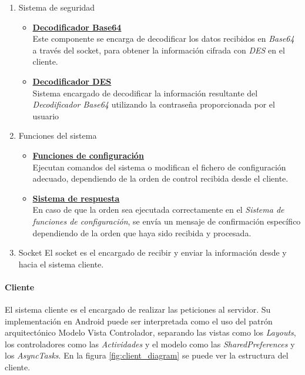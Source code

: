 \documentclass[12pt]{article}
\begin{document}
            \begin{enumerate}
                \item Sistema de seguridad
                    \begin{itemize}
                        \item \textbf{\underline{Decodificador Base64}} \\
                            Este componente se encarga de decodificar los datos recibidos en \textit{Base64} a través del socket, para obtener la información cifrada con \textit{DES} en el cliente.
                        \item \textbf{\underline{Decodificador DES}} \\ 
                            Sistema encargado de decodificar la información resultante del \textit{Decodificador Base64} utilizando la contraseña proporcionada por el usuario
                    \end{itemize}
                \item Funciones del sistema
                    \begin{itemize}
                        \item \textbf{\underline{Funciones de configuración}} \\ 
                            Ejecutan comandos del sistema o modifican el fichero de configuración adecuado, dependiendo de la orden de control recibida desde el cliente.
                        \item \textbf{\underline{Sistema de respuesta}} \\
                            En caso de que la orden sea ejecutada correctamente en el \textit{Sistema de funciones de configuración}, se envía un mensaje de confirmación específico dependiendo de la orden que haya sido recibida y procesada.
                    \end{itemize}
                \item Socket
                    El socket es el encargado de recibir y enviar la información desde y hacia el sistema cliente.
            \end{enumerate}

            \paragraph{ Cliente}
            El sistema cliente es el encargado de realizar las peticiones al servidor. Su implementación en Android puede ser interpretada como el uso del patrón arquitectónico Modelo Vista Controlador, separando las vistas como los \textit{Layouts}, los controladores como las \textit{Actividades} y el modelo como las \textit{SharedPreferences} y los \textit{AsyncTasks}. En la figura \ref{fig:client_diagram} se puede ver la estructura del cliente.
\end{document}
